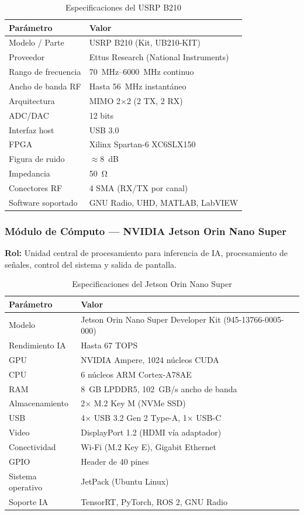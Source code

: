 \documentclass[12pt,a4paper]{article}
\begin{document}
\begin{table}[H]
\centering
\caption{Especificaciones del USRP B210}
\begin{tabular}{@{}ll@{}}
\toprule
\textbf{Parámetro} & \textbf{Valor} \\
\midrule
Modelo / Parte & USRP B210 (Kit, UB210-KIT) \\
Proveedor & Ettus Research (National Instruments) \\
Rango de frecuencia & \qtyrange{70}{6000}{\MHz} continuo \\
Ancho de banda RF & Hasta \qty{56}{\MHz} instantáneo \\
Arquitectura & MIMO 2$\times$2 (2 TX, 2 RX) \\
ADC/DAC & 12 bits \\
Interfaz host & USB 3.0 \\
FPGA & Xilinx Spartan-6 XC6SLX150 \\
Figura de ruido & $\approx$\qty{8}{\dB} \\
Impedancia & \qty{50}{\ohm} \\
Conectores RF & 4 SMA (RX/TX por canal) \\
Software soportado & GNU Radio, UHD, MATLAB, LabVIEW \\
\bottomrule
\end{tabular}
\end{table}

\subsubsection{Módulo de Cómputo --- NVIDIA Jetson Orin Nano Super}

\textbf{Rol:} Unidad central de procesamiento para inferencia de IA, procesamiento de señales, control del sistema y salida de pantalla.

\begin{table}[H]
\centering
\caption{Especificaciones del Jetson Orin Nano Super}
\begin{tabular}{@{}ll@{}}
\toprule
\textbf{Parámetro} & \textbf{Valor} \\
\midrule
Modelo & Jetson Orin Nano Super Developer Kit (945-13766-0005-000) \\
Rendimiento IA & Hasta 67 TOPS \\
GPU & NVIDIA Ampere, 1024 núcleos CUDA \\
CPU & 6 núcleos ARM Cortex-A78AE \\
RAM & 8~GB LPDDR5, 102~GB/s ancho de banda \\
Almacenamiento & 2$\times$ M.2 Key M (NVMe SSD) \\
USB & 4$\times$ USB 3.2 Gen 2 Type-A, 1$\times$ USB-C \\
Video & DisplayPort 1.2 (HDMI vía adaptador) \\
Conectividad & Wi-Fi (M.2 Key E), Gigabit Ethernet \\
GPIO & Header de 40 pines \\
Sistema operativo & JetPack (Ubuntu Linux) \\
Soporte IA & TensorRT, PyTorch, ROS 2, GNU Radio \\
\bottomrule
\end{tabular}
\end{table}
\end{document}
